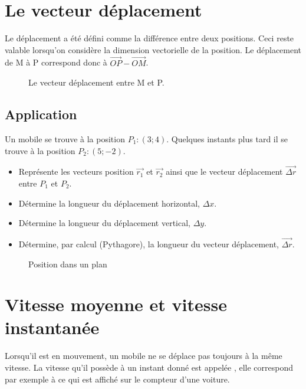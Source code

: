\newpage

\section{Le vecteur déplacement}
Le déplacement a été défini comme la différence entre deux positions. Ceci reste valable lorsqu'on considère la dimension vectorielle de la position. Le déplacement de M à P correspond donc à \(\vec{OP} - \vec{OM}\).
\begin{figure}[h!]
    \centering
    \resizebox{0.8\linewidth}{!}{}
    \caption{Le vecteur déplacement entre M et P.}
    \label{vecteur_deplacement}
\end{figure}

\newpage

\subsection{Application}
Un mobile se trouve à la position \(P_1 :(3 ; 4)\). Quelques instants plus tard il se trouve à la position \(P_2 :(5 ; -2)\).
\begin{itemize}[label= \textbullet]
    \item Représente les vecteurs position \(\vec{r_1}\) et \(\vec{r_2}\) ainsi que le vecteur déplacement \(\vec{\Delta r}\) entre \(P_1\) et \(P_2\).
    \item Détermine la longueur du déplacement horizontal, \(\Delta x\).
    \item Détermine la longueur du déplacement vertical, \(\Delta y\).
    \item Détermine, par calcul (Pythagore), la longueur du vecteur déplacement, \(\vec{\Delta r}\).
\end{itemize}
\begin{figure}[h!]
    \centering
    \resizebox{0.8\linewidth}{!}{}
    \caption{Position dans un plan}
    \label{repere_cartesien}
\end{figure}

\newpage

\section{Vitesse moyenne et vitesse instantanée}
Lorsqu'il est en mouvement, un mobile ne se déplace pas toujours à la même vitesse. La vitesse qu'il possède à un instant donné est appelée , elle correspond par exemple à ce qui est affiché sur le compteur d'une voiture.\\

